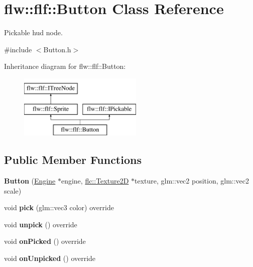 \hypertarget{classflw_1_1flf_1_1Button}{}\section{flw\+:\+:flf\+:\+:Button Class Reference}
\label{classflw_1_1flf_1_1Button}


Pickable hud node.  




{\ttfamily \#include $<$Button.\+h$>$}

Inheritance diagram for flw\+:\+:flf\+:\+:Button\+:\begin{figure}[H]
\begin{center}
\leavevmode
\includegraphics[height=3.000000cm]{classflw_1_1flf_1_1Button}
\end{center}
\end{figure}
\subsection*{Public Member Functions}
\begin{DoxyCompactItemize}
\item 
\mbox{\label{classflw_1_1flf_1_1Button_ad3ae337aac8f1db876ac67decefac587}} 
{\bfseries Button} (\hyperlink{classflw_1_1Engine}{Engine} $\ast$engine, \hyperlink{classflw_1_1flc_1_1Texture2D}{flc\+::\+Texture2D} $\ast$texture, glm\+::vec2 position, glm\+::vec2 scale)
\item 
\mbox{\label{classflw_1_1flf_1_1Button_a719b2df023e75d1706adcb83327fb94f}} 
void {\bfseries pick} (glm\+::vec3 color) override
\item 
\mbox{\label{classflw_1_1flf_1_1Button_a70c6c0ad26ee8b953eaf7a4b8c477e42}} 
void {\bfseries unpick} () override
\item 
\mbox{\label{classflw_1_1flf_1_1Button_a8ed9587ee4157b9b5c148f81e63b1a51}} 
void {\bfseries on\+Picked} () override
\item 
\mbox{\label{classflw_1_1flf_1_1Button_aaf3a95201ffbd05d132cacd70fddb0c5}} 
void {\bfseries on\+Unpicked} () override
\end{DoxyCompactItemize}
